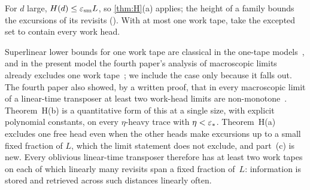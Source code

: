 \begin{outline}
For $d$ large, $H(d)\le\varepsilon_{\mathrm{sm}}L$, so \cref{thm:H}(a) applies; the height of a family bounds the excursions of its revisits
(). With at most one work tape, take the excepted set to contain every work head.
\end{outline}

Superlinear lower bounds for one work tape are classical in the one-tape models~\cite{DMS1991,DietzfelbingerMaass1993}, and in the present
model the fourth paper's analysis of macroscopic limits already excludes one work tape~\cite[Corollary~3.18(c)]{FourthPaper2026}; we
include the case only because it falls out. The fourth paper also showed, by a written proof, that in every macroscopic limit of a
linear-time transposer at least two work-head limits are non-monotone~\cite[Corollaries~3.18 and~3.24]{FourthPaper2026}.
Theorem~H(b) is a quantitative form of this at a single size, with explicit polynomial constants, on every $\eta$-heavy trace with
$\eta<\varepsilon_*$. Theorem~H(a) excludes one free head even when the other heads make excursions up to a small fixed fraction of $L$, which the
limit statement does not exclude, and part~(c) is new. Every oblivious linear-time transposer therefore has at least two work tapes on
each of which linearly many revisits span a fixed fraction of~$L$: information is stored and retrieved across such distances linearly
often.
